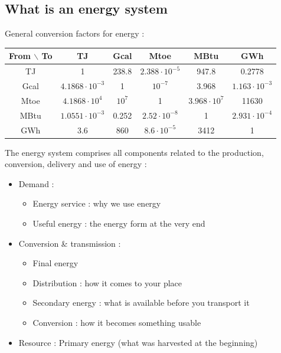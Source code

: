 \documentclass[../main.tex]{subfiles}
\begin{document}
\localtableofcontents

\subsection{What is an energy system}
General conversion factors for energy : \\
\begin{table}[hbt!]
    \centering
    \begin{tabular}{|c|c|c|c|c|c|}
        \hline
        From $\backslash$ To & TJ & Gcal & Mtoe & MBtu & GWh \\\hline
        TJ & 1 & 238.8 & $2.388 \cdot 10^{-5}$ & 947.8 & 0.2778\\ \hline
        Gcal & $4.1868 \cdot 10^{-3}$ & 1 & $10^{-7}$ & 3.968 & $1.163 \cdot 10^{-3}$\\ \hline
        Mtoe & $4.1868\cdot 10^{4}$ & $10^7$ & 1 & $3.968 \cdot 10^7$ & 11630\\ \hline
        MBtu & $1.0551 \cdot 10^{-3}$ & 0.252 & $2.52 \cdot 10^{-8}$ & 1 & $2.931 \cdot 10^{-4}$\\ \hline
        GWh & 3.6 & 860 & $8.6 \cdot 10^{-5}$ & 3412 & 1\\ \hline
    \end{tabular}
\end{table}

The energy system comprises all components related to the production, conversion, delivery and use of energy : 
\begin{itemize}
    \item Demand : \begin{itemize}
        \item Energy service : why we use energy\\
        \item Useful energy : the energy form at the very end\\
    \end{itemize}
    \item Conversion \& transmission : \begin{itemize}
        \item Final energy\\
        \item Distribution : how it comes to your place\\
        \item Secondary energy : what is available before you transport it\\
        \item Conversion : how it becomes something usable\\
    \end{itemize}
    \item Resource : Primary energy (what was harvested at the beginning)\\
\end{itemize}
\end{document}
